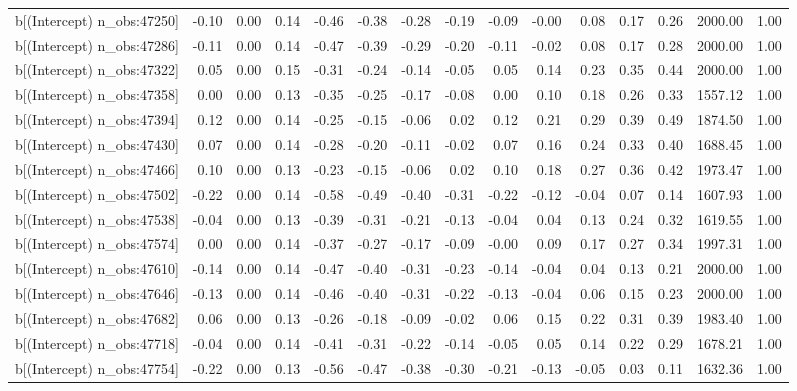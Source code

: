 \begin{table}[ht]
\begin{tabular}{rrrrrrrrrrrrrrr}
  b[(Intercept) n\_obs:47250] & -0.10 & 0.00 & 0.14 & -0.46 & -0.38 & -0.28 & -0.19 & -0.09 & -0.00 & 0.08 & 0.17 & 0.26 & 2000.00 & 1.00 \\ 
  b[(Intercept) n\_obs:47286] & -0.11 & 0.00 & 0.14 & -0.47 & -0.39 & -0.29 & -0.20 & -0.11 & -0.02 & 0.08 & 0.17 & 0.28 & 2000.00 & 1.00 \\ 
  b[(Intercept) n\_obs:47322] & 0.05 & 0.00 & 0.15 & -0.31 & -0.24 & -0.14 & -0.05 & 0.05 & 0.14 & 0.23 & 0.35 & 0.44 & 2000.00 & 1.00 \\ 
  b[(Intercept) n\_obs:47358] & 0.00 & 0.00 & 0.13 & -0.35 & -0.25 & -0.17 & -0.08 & 0.00 & 0.10 & 0.18 & 0.26 & 0.33 & 1557.12 & 1.00 \\ 
  b[(Intercept) n\_obs:47394] & 0.12 & 0.00 & 0.14 & -0.25 & -0.15 & -0.06 & 0.02 & 0.12 & 0.21 & 0.29 & 0.39 & 0.49 & 1874.50 & 1.00 \\ 
  b[(Intercept) n\_obs:47430] & 0.07 & 0.00 & 0.14 & -0.28 & -0.20 & -0.11 & -0.02 & 0.07 & 0.16 & 0.24 & 0.33 & 0.40 & 1688.45 & 1.00 \\ 
  b[(Intercept) n\_obs:47466] & 0.10 & 0.00 & 0.13 & -0.23 & -0.15 & -0.06 & 0.02 & 0.10 & 0.18 & 0.27 & 0.36 & 0.42 & 1973.47 & 1.00 \\ 
  b[(Intercept) n\_obs:47502] & -0.22 & 0.00 & 0.14 & -0.58 & -0.49 & -0.40 & -0.31 & -0.22 & -0.12 & -0.04 & 0.07 & 0.14 & 1607.93 & 1.00 \\ 
  b[(Intercept) n\_obs:47538] & -0.04 & 0.00 & 0.13 & -0.39 & -0.31 & -0.21 & -0.13 & -0.04 & 0.04 & 0.13 & 0.24 & 0.32 & 1619.55 & 1.00 \\ 
  b[(Intercept) n\_obs:47574] & 0.00 & 0.00 & 0.14 & -0.37 & -0.27 & -0.17 & -0.09 & -0.00 & 0.09 & 0.17 & 0.27 & 0.34 & 1997.31 & 1.00 \\ 
  b[(Intercept) n\_obs:47610] & -0.14 & 0.00 & 0.14 & -0.47 & -0.40 & -0.31 & -0.23 & -0.14 & -0.04 & 0.04 & 0.13 & 0.21 & 2000.00 & 1.00 \\ 
  b[(Intercept) n\_obs:47646] & -0.13 & 0.00 & 0.14 & -0.46 & -0.40 & -0.31 & -0.22 & -0.13 & -0.04 & 0.06 & 0.15 & 0.23 & 2000.00 & 1.00 \\ 
  b[(Intercept) n\_obs:47682] & 0.06 & 0.00 & 0.13 & -0.26 & -0.18 & -0.09 & -0.02 & 0.06 & 0.15 & 0.22 & 0.31 & 0.39 & 1983.40 & 1.00 \\ 
  b[(Intercept) n\_obs:47718] & -0.04 & 0.00 & 0.14 & -0.41 & -0.31 & -0.22 & -0.14 & -0.05 & 0.05 & 0.14 & 0.22 & 0.29 & 1678.21 & 1.00 \\ 
  b[(Intercept) n\_obs:47754] & -0.22 & 0.00 & 0.13 & -0.56 & -0.47 & -0.38 & -0.30 & -0.21 & -0.13 & -0.05 & 0.03 & 0.11 & 1632.36 & 1.00 \\ 

\end{tabular}
\end{table}

